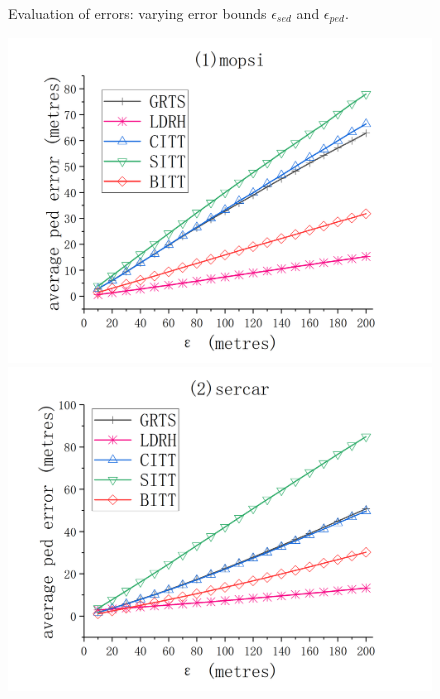 {\begin{figure}[tb!]
	\vspace{-1ex}
	\caption{\small Evaluation of \sed errors: varying error bounds $\epsilon_{sed}$ and $\epsilon_{ped}$.}
	\label{fig:sed-error}
	\vspace{-1ex}
\end{figure}

\begin{figure}[tb!]
	\centering
	\includegraphics[scale = 0.560]{figures/Fig-mopsi-ped-error.png}\hspace{1ex}
	\includegraphics[scale = 0.560]{figures/Fig-sercar-ped-error.png}\hspace{1ex}

\end{figure}}
